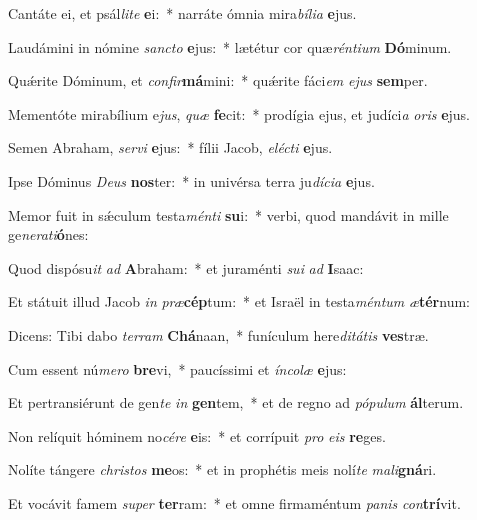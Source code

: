 \item Cantáte ei, et psál\textit{li}\textit{te} \textbf{e}i:~* narráte ómnia mira\textit{bí}\textit{li}\textit{a} \textbf{e}jus.
\item Laudámini in nómine \textit{sanc}\textit{to} \textbf{e}jus:~* lætétur cor quæ\textit{rén}\textit{ti}\textit{um} \textbf{Dó}minum.
\item Quǽrite Dóminum, et \textit{con}\textit{fir}\textbf{má}mini:~* quǽrite fáci\textit{em} \textit{e}\textit{jus} \textbf{sem}per.
\item Mementóte mirabílium e\textit{jus}, \textit{quæ} \textbf{fe}cit:~* prodígia ejus, et judíci\textit{a} \textit{o}\textit{ris} \textbf{e}jus.
\item Semen Abraham, \textit{ser}\textit{vi} \textbf{e}jus:~* fílii Jacob, \textit{e}\textit{léc}\textit{ti} \textbf{e}jus.
\item Ipse Dóminus \textit{De}\textit{us} \textbf{nos}ter:~* in univérsa terra ju\textit{dí}\textit{ci}\textit{a} \textbf{e}jus.
\item Memor fuit in sǽculum testa\textit{mén}\textit{ti} \textbf{su}i:~* verbi, quod mandávit in mille ge\textit{ne}\textit{ra}\textit{ti}\textbf{ó}nes:
\item Quod dispósu\textit{it} \textit{ad} \textbf{A}braham:~* et juraménti \textit{su}\textit{i} \textit{ad} \textbf{I}saac:
\item Et státuit illud Jacob \textit{in} \textit{præ}\textbf{cép}tum:~* et Israël in testa\textit{mén}\textit{tum} \textit{æ}\textbf{tér}num:
\item Dicens: Tibi dabo \textit{ter}\textit{ram} \textbf{Chá}naan,~* funículum here\textit{di}\textit{tá}\textit{tis} \textbf{ves}træ.
\item Cum essent nú\textit{me}\textit{ro} \textbf{bre}vi,~* paucíssimi et \textit{ín}\textit{co}\textit{læ} \textbf{e}jus:
\item Et pertransiérunt de gen\textit{te} \textit{in} \textbf{gen}tem,~* et de regno ad \textit{pó}\textit{pu}\textit{lum} \textbf{ál}terum.
\item Non relíquit hóminem no\textit{cé}\textit{re} \textbf{e}is:~* et corrípuit \textit{pro} \textit{e}\textit{is} \textbf{re}ges.
\item Nolíte tángere \textit{chris}\textit{tos} \textbf{me}os:~* et in prophétis meis nolí\textit{te} \textit{ma}\textit{li}\textbf{gná}ri.
\item Et vocávit famem \textit{su}\textit{per} \textbf{ter}ram:~* et omne firmaméntum \textit{pa}\textit{nis} \textit{con}\textbf{trí}vit.
